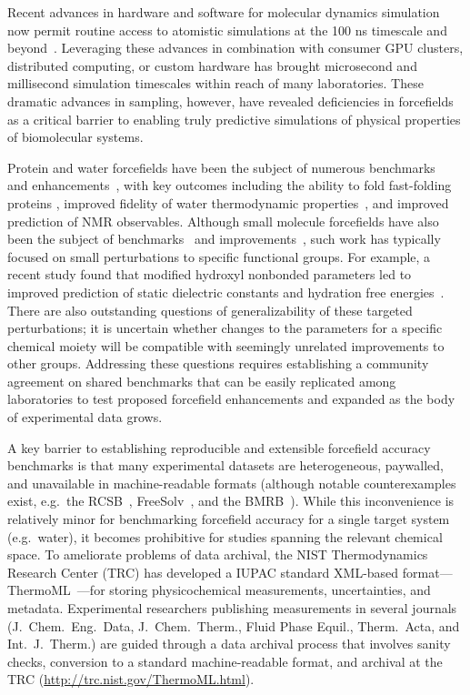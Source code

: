 \documentclass[aps,pre,twocolumn,nofootinbib,superscriptaddress,linenumbers]{revtex4-1}
\begin{document}
Recent advances in hardware and software for molecular dynamics simulation now permit routine access to atomistic simulations at the 100 ns timescale and beyond~\cite{salomon2013routine}.
Leveraging these advances in combination with consumer GPU clusters, distributed computing, or custom hardware has brought microsecond and millisecond simulation timescales within reach of many laboratories.  
These dramatic advances in sampling, however, have revealed deficiencies in forcefields as a critical barrier to enabling truly predictive simulations of physical properties of biomolecular systems.  

Protein and water forcefields have been the subject of numerous benchmarks~\cite{lindorff2012systematic, beauchamp2012protein, best2008} and enhancements~\cite{li2011iterative, best2012optimization, Lindorff-Larsen2010}, with key outcomes including the ability to fold fast-folding proteins \cite{shaw2011, ensign2007heterogeneity, Voelz2010}, improved fidelity of water thermodynamic properties~\cite{horn2004}, and improved prediction of NMR observables.  
Although small molecule forcefields have also been the subject of benchmarks~\cite{caleman2011force} and improvements~\cite{fennell2014fixed}, such work has typically focused on small perturbations to specific functional groups.  
For example, a recent study found that modified hydroxyl nonbonded parameters led to improved prediction of static dielectric constants and hydration free energies~\cite{fennell2014fixed}.
There are also outstanding questions of generalizability of these targeted perturbations; it is uncertain whether changes to the parameters for a specific chemical moiety will be compatible with seemingly unrelated improvements to other groups.
Addressing these questions requires establishing a community agreement on shared benchmarks that can be easily replicated among laboratories to test proposed forcefield enhancements and expanded as the body of experimental data grows.

A key barrier to establishing reproducible and extensible forcefield accuracy benchmarks is that many experimental datasets are heterogeneous, paywalled, and unavailable in machine-readable formats (although notable counterexamples exist, e.g.~the RCSB~\cite{Berman2000}, FreeSolv~\cite{freesolv}, and the BMRB~\cite{Ulrich2008}).  
While this inconvenience is relatively minor for benchmarking forcefield accuracy for a single target system (e.g.~water), it becomes prohibitive for studies spanning the relevant chemical space.  
To ameliorate problems of data archival, the NIST Thermodynamics Research Center (TRC) has developed a IUPAC standard XML-based format---ThermoML~\cite{frenkel2006xml}---for storing physicochemical measurements, uncertainties, and metadata.
Experimental researchers publishing measurements in several journals (J.~Chem.~Eng.~Data, J.~Chem.~Therm., Fluid Phase Equil., Therm.~Acta, and Int.~J.~Therm.) are guided through a data archival process that involves sanity checks, conversion to a standard machine-readable format, and archival at the TRC (\url{http://trc.nist.gov/ThermoML.html}).  
\end{document}
